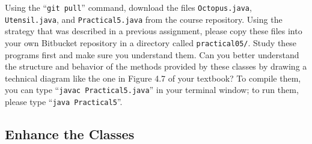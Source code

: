 \begin{sloppypar}
Using the ``{\tt git pull}'' command, download the files {\tt Octopus.java}, {\tt Utensil.java}, and {\tt Practical5.java}
from the course repository. Using the strategy that was described in a previous assignment, please copy these files into
your own Bitbucket repository in a directory called {\tt practical05/}. Study these programs first and make sure you
understand them. Can you better understand the structure and behavior of the methods provided by these classes by
drawing a technical diagram like the one in Figure 4.7 of your textbook? To compile them, you can type ``{\tt javac
  Practical5.java}'' in your terminal window; to run them, please type ``{\tt java Practical5}''.
\end{sloppypar}

\vspace*{-.15in}
\subsection*{Enhance the Classes} 
\vspace*{-.05in}

